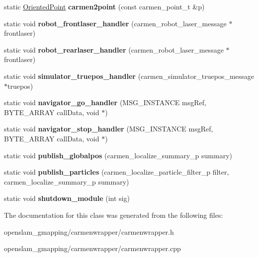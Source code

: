 \begin{DoxyCompactItemize}
static \hyperlink{structGMapping_1_1orientedpoint}{Oriented\+Point} {\bfseries carmen2point} (const carmen\+\_\+point\+\_\+t \&p)
\item 
\mbox{\label{classGMapping_1_1CarmenWrapper_ab2bae58fa040de947db99b3ee06752d3}} 
static void {\bfseries robot\+\_\+frontlaser\+\_\+handler} (carmen\+\_\+robot\+\_\+laser\+\_\+message $\ast$frontlaser)
\item 
\mbox{\label{classGMapping_1_1CarmenWrapper_a05d508bf5c8ec81fe901d49dc3b0846c}} 
static void {\bfseries robot\+\_\+rearlaser\+\_\+handler} (carmen\+\_\+robot\+\_\+laser\+\_\+message $\ast$frontlaser)
\item 
\mbox{\label{classGMapping_1_1CarmenWrapper_a83290d6c3d13e9646ff051273bcbcf74}} 
static void {\bfseries simulator\+\_\+truepos\+\_\+handler} (carmen\+\_\+simulator\+\_\+truepos\+\_\+message $\ast$truepos)
\item 
\mbox{\label{classGMapping_1_1CarmenWrapper_ac09a990f304e37ce031d7bc7ac72700a}} 
static void {\bfseries navigator\+\_\+go\+\_\+handler} (M\+S\+G\+\_\+\+I\+N\+S\+T\+A\+N\+CE msg\+Ref, B\+Y\+T\+E\+\_\+\+A\+R\+R\+AY call\+Data, void $\ast$)
\item 
\mbox{\label{classGMapping_1_1CarmenWrapper_a78e15b8cd52751912cfde51049c0b56c}} 
static void {\bfseries navigator\+\_\+stop\+\_\+handler} (M\+S\+G\+\_\+\+I\+N\+S\+T\+A\+N\+CE msg\+Ref, B\+Y\+T\+E\+\_\+\+A\+R\+R\+AY call\+Data, void $\ast$)
\item 
\mbox{\label{classGMapping_1_1CarmenWrapper_a75e5d750d18250405f98f82201071f14}} 
static void {\bfseries publish\+\_\+globalpos} (carmen\+\_\+localize\+\_\+summary\+\_\+p summary)
\item 
\mbox{\label{classGMapping_1_1CarmenWrapper_a6aa4563f0a8f77dcf717f15f98f0abd7}} 
static void {\bfseries publish\+\_\+particles} (carmen\+\_\+localize\+\_\+particle\+\_\+filter\+\_\+p filter, carmen\+\_\+localize\+\_\+summary\+\_\+p summary)
\item 
\mbox{\label{classGMapping_1_1CarmenWrapper_a702f36d99a24aece5e3d7dc6a49d416f}} 
static void {\bfseries shutdown\+\_\+module} (int sig)
\end{DoxyCompactItemize}


The documentation for this class was generated from the following files\+:\begin{DoxyCompactItemize}
\item 
openslam\+\_\+gmapping/carmenwrapper/carmenwrapper.\+h\item 
openslam\+\_\+gmapping/carmenwrapper/carmenwrapper.\+cpp\end{DoxyCompactItemize}
